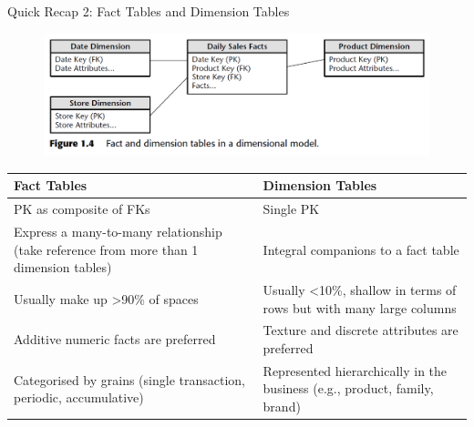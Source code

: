 \begin{frame}[fragile]{Quick Recap 2: Fact Tables and Dimension Tables}
	\vspace{-10pt}
	\begin{figure}
		\includegraphics[width=1\textwidth, trim=0 0 0 0, clip]{t9/images/tables.png}
	\end{figure}
	\vspace{-20pt}
	\begin{footnotesize}
	\begin{table}[]
		\begin{tabular}{|p{5.2cm}|p{5.2cm}|}
			\hline
			\textbf{Fact Tables} & \textbf{Dimension Tables}                                                     \\ \hline
			PK as composite of FKs                                                                 & Single PK                                                                     \\ \hline
			Express a many-to-many relationship (take reference from more than 1 dimension tables) & Integral companions to a fact table                                           \\ \hline
			Usually make up \textgreater{}90\% of spaces                                           & Usually \textless{}10\%, shallow in terms of rows but with many large columns \\ \hline
			Additive numeric facts are preferred                                                   & Texture and discrete attributes are preferred                                 \\ \hline
			Categorised by grains (single transaction, periodic, accumulative)                     & Represented hierarchically in the business (e.g., product, family, brand)     \\ \hline
		\end{tabular}
	\end{table}
	\end{footnotesize}	
\end{frame}

